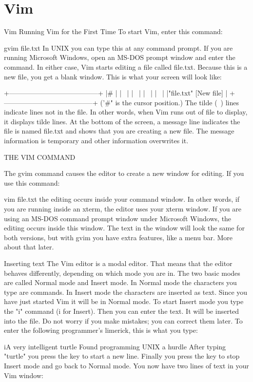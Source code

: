 \section{Vim}

Vim
Running Vim for the First Time
To start Vim, enter this command:

gvim file.txt
In UNIX you can type this at any command prompt. If you are running Microsoft Windows, open an MS-DOS prompt window and enter the command. In either case, Vim starts editing a file called file.txt. Because this is a new file, you get a blank window. This is what your screen will look like:

+---------------------------------------+
|#                  |
|~                  |
|~                  |
|~                  |
|~                  |
|"file.txt" [New file]          |
+---------------------------------------+
    ('#" is the cursor position.)
The tilde (~) lines indicate lines not in the file. In other words, when Vim runs out of file to display, it displays tilde lines. At the bottom of the screen, a message line indicates the file is named file.txt and shows that you are creating a new file. The message information is temporary and other information overwrites it.

THE VIM COMMAND

The gvim command causes the editor to create a new window for editing. If you use this command:

vim file.txt
the editing occurs inside your command window. In other words, if you are running inside an xterm, the editor uses your xterm window. If you are using an MS-DOS command prompt window under Microsoft Windows, the editing occurs inside this window. The text in the window will look the same for both versions, but with gvim you have extra features, like a menu bar. More about that later.

Inserting text
The Vim editor is a modal editor. That means that the editor behaves differently, depending on which mode you are in. The two basic modes are called Normal mode and Insert mode. In Normal mode the characters you type are commands. In Insert mode the characters are inserted as text. Since you have just started Vim it will be in Normal mode. To start Insert mode you type the "i" command (i for Insert). Then you can enter the text. It will be inserted into the file. Do not worry if you make mistakes; you can correct them later. To enter the following programmer's limerick, this is what you type:

iA very intelligent turtle
Found programming UNIX a hurdle
After typing "turtle" you press the key to start a new line. Finally you press the key to stop Insert mode and go back to Normal mode. You now have two lines of text in your Vim window:


